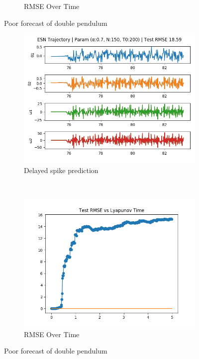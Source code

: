 \documentclass{article}
\begin{document}
\begin{figure}[H]
\begin{subfigure}[b]{0.45\textwidth}
        \caption{RMSE Over Time}
    \end{subfigure}
    \caption{Poor forecast of double pendulum}
\end{figure}

\begin{figure}[H]
    \centering
    \begin{subfigure}[b]{0.45\textwidth}
        \includegraphics[width=\textwidth]{doc/paper/images/doub_pend/rank_1_param_63_fit.png}
        \caption{Delayed spike prediction}
    \end{subfigure}
    ~
    \begin{subfigure}[b]{0.45\textwidth}
        \includegraphics[width=\textwidth]{doc/paper/images/doub_pend/rank_2_param_305_rmse.png}
        \caption{RMSE Over Time}
    \end{subfigure}
    \caption{Poor forecast of double pendulum}
\end{figure}
\end{document}
